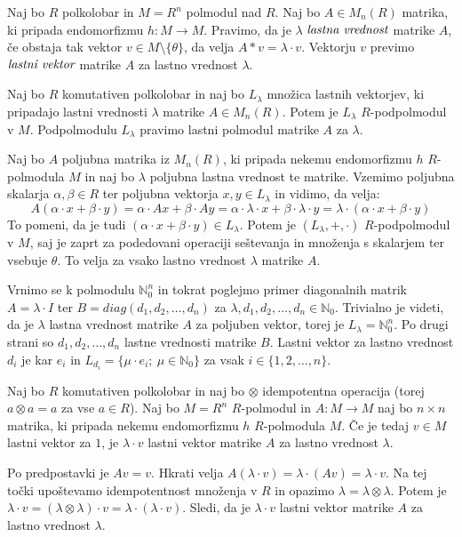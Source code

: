 \documentclass[mat1]{fmfdelo}
\newcommand{\N}{\mathbb{N}}
\newcommand{\No}{\N_0}
\newcommand{\pojem}[1]{\ensuremath{\emph{#1}}}
\newcommand{\map}[3]{\ensuremath{{#1}:{#2}\rightarrow{#3}}}
\begin{document}
\begin{definicija}
	Naj bo $R$ polkolobar in $M = R^n$ polmodul nad $R$. Naj bo $A\in M_n(R)$ matrika, ki pripada endomorfizmu $\map{h}{M}{M}$. Pravimo, da je $\lambda$ \pojem{lastna vrednost} matrike $A$, če obstaja tak vektor $v\in M\setminus\{\theta\}$, da velja $A * v = \lambda \cdot v$. Vektorju $v$ previmo \pojem{lastni vektor} matrike $A$ za lastno vrednost $\lambda$.
\end{definicija}


\begin{trditev}
Naj bo $R$ komutativen polkolobar in naj bo $L_\lambda$ množica lastnih vektorjev, ki pripadajo lastni vrednosti $\lambda$ matrike $A\in M_n(R)$. Potem je $L_\lambda$ $R$-podpolmodul v $M$. Podpolmodulu $L_\lambda$ pravimo lastni polmodul matrike $A$ za $\lambda$.
\end{trditev}

\begin{dokaz}
Naj bo $A$ poljubna matrika iz $M_n(R)$, ki pripada nekemu endomorfizmu $h$ $R$-polmodula $M$ in naj bo $\lambda$ poljubna lastna vrednost te matrike. Vzemimo poljubna skalarja $\alpha, \beta\in R$ ter poljubna vektorja $x, y \in L_\lambda$ in vidimo, da velja: $$A(\alpha\cdot x + \beta\cdot y) = \alpha\cdot Ax + \beta\cdot Ay = \alpha\cdot\lambda\cdot x + \beta\cdot\lambda\cdot y = \lambda\cdot (\alpha\cdot x + \beta\cdot y)$$ To pomeni, da je tudi $(\alpha\cdot x + \beta\cdot y)\in L_\lambda$. Potem je $(L_\lambda, +, \cdot)$ $R$-podpolmodul v $M$, saj je zaprt za podedovani operaciji seštevanja in množenja s skalarjem ter vsebuje $\theta$. To velja za vsako lastno vrednost $\lambda$ matrike $A$.
\end{dokaz}

Vrnimo se k polmodulu $\No^n$ in tokrat poglejmo primer diagonalnih matrik $A = \lambda \cdot I$ ter $B = diag(d_1, d_2, \ldots, d_n)$ za $\lambda, d_1, d_2, \ldots, d_n \in \No$. Trivialno je videti, da je $\lambda$ lastna vrednost matrike $A$ za poljuben vektor, torej je $L_\lambda = \No^n$. Po drugi strani so $d_1, d_2, \ldots, d_n$ lastne vrednosti matrike $B$. Lastni vektor za lastno vrednost $d_i$ je kar $e_i$ in $L_{d_i} = \{\mu \cdot e_i;~\mu\in \No\}$ za vsak $i\in \{1, 2, \ldots, n\}$.

\begin{trditev}
Naj bo $R$ komutativen polkolobar in naj bo $\otimes$ idempotentna operacija (torej $a\otimes a = a$ za vse  $a\in R$). Naj bo $M=R^n$ $R$-polmodul in $\map{A}{M}{M}$ naj bo $n\times n$ matrika, ki pripada nekemu endomorfizmu $h$ $R$-polmodula $M$. Če je tedaj $v\in M$ lastni vektor za $1$, je $\lambda\cdot v$ lastni vektor matrike $A$ za lastno vrednost $\lambda$.
\end{trditev}
\begin{dokaz}
	Po predpostavki je $Av = v$. Hkrati velja $A(\lambda\cdot v) = \lambda\cdot (Av) = \lambda\cdot v$. Na tej točki upoštevamo idempotentnost množenja v $R$ in opazimo $\lambda = \lambda\otimes\lambda$. Potem je $\lambda\cdot v = (\lambda\otimes\lambda)\cdot v = \lambda \cdot (\lambda\cdot v)$. Sledi, da je $\lambda\cdot v$ lastni vektor matrike $A$ za lastno vrednost $\lambda$.
\end{dokaz}
\end{document}
